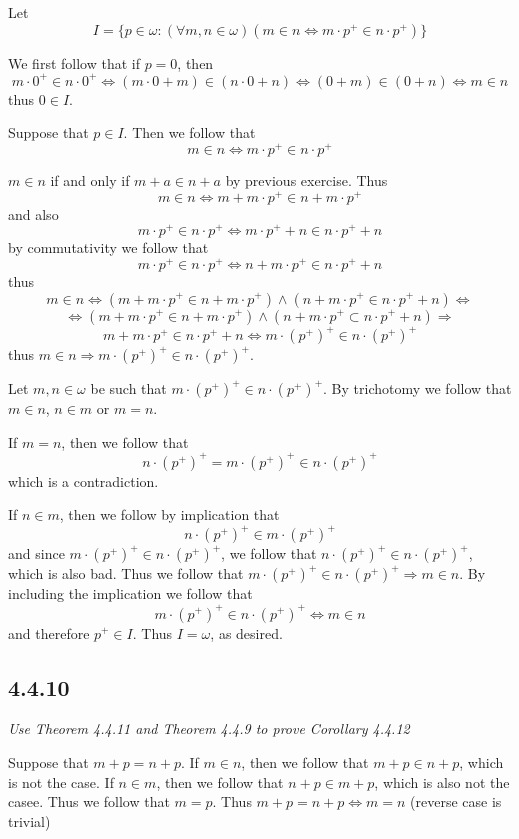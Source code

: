 \documentclass[11pt,oneside,titlepage]{book}
\DeclareMathOperator \lra {\Leftrightarrow}
\DeclareMathOperator \ra {\Rightarrow}
\begin{document}
Let
$$I = \{p \in \omega: (\forall m, n \in \omega)( m \in n \lra  m \cdot p^+ \in n \cdot p^+)\}$$

We first follow that if $p = 0$, then
$$m \cdot 0^+ \in n \cdot 0^+ \lra (m \cdot 0 + m) \in (n \cdot 0 + n) \lra (0 + m) \in (0 + n)
\lra m \in n$$
thus $0 \in I$.

Suppose that $p \in I$. Then we follow that
$$m \in n \lra m \cdot p^+ \in n \cdot p^+$$

$m \in n$ if and only if $m + a \in n + a$ by previous exercise. Thus
$$m \in n \lra m + m \cdot p^+ \in n + m \cdot p^+$$
and also
$$ m \cdot p^+ \in n \cdot p^+ \lra  m \cdot p^+ + n \in n \cdot p^+  + n$$
by commutativity we follow that
$$ m \cdot p^+ \in n \cdot p^+ \lra  n + m \cdot p^+ \in n \cdot p^+  + n$$
thus
$$m \in n \lra (m + m \cdot p^+ \in n + m \cdot p^+) \land (n + m \cdot p^+ \in n \cdot p^+  + n)
\lra$$
$$\lra (m + m \cdot p^+ \in n + m \cdot p^+) \land
(n + m \cdot p^+ \subset n \cdot p^+  + n) \ra$$
$$ m + m \cdot p^+ \in n \cdot p^+  + n \lra m \cdot (p^+)^+ \in n \cdot (p^+)^+$$
thus $m \in n \ra m \cdot (p^+)^+ \in n \cdot (p^+)^+$.

Let $m, n \in \omega$ be such that
$m \cdot (p^+)^+ \in n \cdot (p^+)^+$. By trichotomy we
follow that $m \in n$, $n \in m$ or $m = n$.

If $m = n$, then we follow that
$$n \cdot (p^+)^+ = m \cdot (p^+)^+ \in n \cdot (p^+)^+$$
which is a contradiction.

If $n \in m$, then we follow by implication that 
$$n \cdot (p^+)^+ \in m \cdot (p^+)^+$$
and since $m \cdot (p^+)^+ \in n \cdot (p^+)^+$, we follow that
$n \cdot (p^+)^+ \in n \cdot (p^+)^+$, which is also bad. Thus we follow that
$m \cdot (p^+)^+ \in n \cdot (p^+)^+ \ra m \in n$. By including the implication we follow that
$$m \cdot (p^+)^+ \in n \cdot (p^+)^+ \lra m \in n$$
and therefore $p^+ \in I$. Thus $I = \omega$, as desired.

\subsection*{4.4.10}

\textit{Use Theorem 4.4.11 and Theorem 4.4.9 to prove Corollary 4.4.12}

Suppose that $m + p = n + p$. If $m \in n$, then we follow that $m + p \in n + p$, which
is not the case.
If $n \in m$, then we follow that $n + p \in m + p$, which is also not the casee.
Thus we follow that $m = p$. Thus $m + p = n + p \lra m = n$ (reverse case is trivial)
\end{document}
